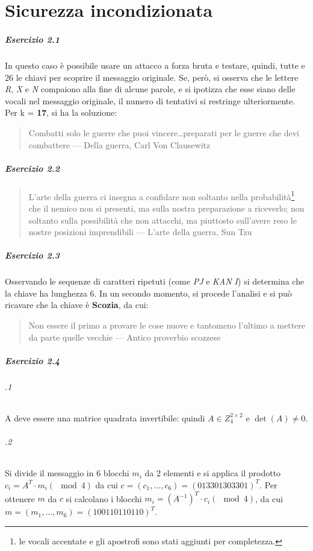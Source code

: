 \chapter{Sicurezza incondizionata}
\paragraph*{Esercizio 2.1}
In questo caso è possibile usare un attacco a forza bruta e testare, quindi, tutte e 26 le chiavi per scoprire il messaggio originale.
Se, però, si osserva che le lettere \emph{R}, \emph{X} e \emph{N} compaiono alla fine di alcune parole, e si ipotizza che esse siano delle vocali nel messaggio originale, il numero di tentativi si restringe ulteriormente.
Per k = \textbf{17}, si ha la soluzione:
\begin{quote}
    Combatti solo le guerre che puoi vincere\dots preparati per le guerre che devi combattere --- Della guerra, Carl Von Clausewitz
\end{quote}

\paragraph*{Esercizio 2.2}
\begin{quote}
    L'arte della guerra ci insegna a confidare non soltanto nella probabilità\footnote{le vocali accentate e gli apostrofi sono stati aggiunti per completezza.} che il nemico non si presenti, ma sulla nostra preparazione a riceverlo; non soltanto sulla possibilità che non attacchi, ma piuttosto sull'avere reso le nostre posizioni imprendibili --- L'arte della guerra, Sun Tzu
\end{quote}

\paragraph*{Esercizio 2.3}
Osservando le sequenze di caratteri ripetuti (come \emph{PJ} e \emph{KAN I}) si determina che la chiave ha lunghezza 6.
In un secondo momento, si procede l'analisi e si può ricavare che la chiave è \textbf{Scozia}, da cui:
\begin{quote}
    Non essere il primo a provare le cose nuove e tantomeno l’ultimo a mettere da parte quelle vecchie --- Antico proverbio scozzese
\end{quote}

\paragraph*{Esercizio 2.4}
\subparagraph*{.1}
A deve essere una matrice quadrata invertibile: quindi $A \in Z^{2 \times 2}_{4}$ e $\det(A) \neq 0$.

\subparagraph*{.2}
Si divide il messaggio in 6 blocchi $m_i$ da 2 elementi e si applica il prodotto $c_i = A^T \cdot m_i (\mod 4)$ da cui $c = (c_1, \dots, c_6) = (013301303301)^T$.
Per ottenere $m$ da $c$ si calcolano i blocchi $m_i = (A^{-1})^T \cdot c_i (\mod 4)$, da cui $m = (m_1, \dots, m_6) = (100110110110)^T$.
